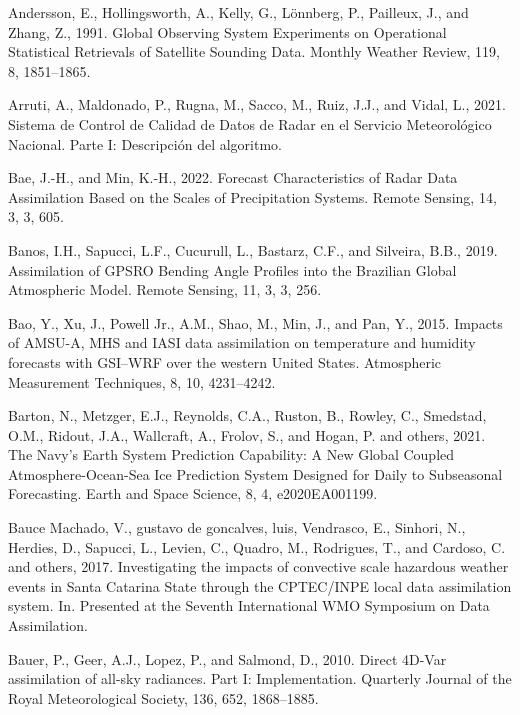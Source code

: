 \documentclass[12pt,oneside,a4paper]{reedthesis}
\begin{document}
\leavevmode\hypertarget{ref-andersson1991}{}%
Andersson, E., Hollingsworth, A., Kelly, G., Lönnberg, P., Pailleux, J., and Zhang, Z., 1991. Global Observing System Experiments on Operational Statistical Retrievals of Satellite Sounding Data. Monthly Weather Review, 119, 8, 1851--1865.

\leavevmode\hypertarget{ref-arruti2021}{}%
Arruti, A., Maldonado, P., Rugna, M., Sacco, M., Ruiz, J.J., and Vidal, L., 2021. Sistema de Control de Calidad de Datos de Radar en el Servicio Meteorológico Nacional. Parte I: Descripción del algoritmo.

\leavevmode\hypertarget{ref-bae2022}{}%
Bae, J.-H., and Min, K.-H., 2022. Forecast Characteristics of Radar Data Assimilation Based on the Scales of Precipitation Systems. Remote Sensing, 14, 3, 3, 605.

\leavevmode\hypertarget{ref-banos2019}{}%
Banos, I.H., Sapucci, L.F., Cucurull, L., Bastarz, C.F., and Silveira, B.B., 2019. Assimilation of GPSRO Bending Angle Profiles into the Brazilian Global Atmospheric Model. Remote Sensing, 11, 3, 3, 256.

\leavevmode\hypertarget{ref-bao2015}{}%
Bao, Y., Xu, J., Powell Jr., A.M., Shao, M., Min, J., and Pan, Y., 2015. Impacts of AMSU-A, MHS and IASI data assimilation on temperature and humidity forecasts with GSI--WRF over the western United States. Atmospheric Measurement Techniques, 8, 10, 4231--4242.

\leavevmode\hypertarget{ref-barton2021}{}%
Barton, N., Metzger, E.J., Reynolds, C.A., Ruston, B., Rowley, C., Smedstad, O.M., Ridout, J.A., Wallcraft, A., Frolov, S., and Hogan, P. and others, 2021. The Navy's Earth System Prediction Capability: A New Global Coupled Atmosphere-Ocean-Sea Ice Prediction System Designed for Daily to Subseasonal Forecasting. Earth and Space Science, 8, 4, e2020EA001199.

\leavevmode\hypertarget{ref-baucemachado2017}{}%
Bauce Machado, V., gustavo de goncalves, luis, Vendrasco, E., Sinhori, N., Herdies, D., Sapucci, L., Levien, C., Quadro, M., Rodrigues, T., and Cardoso, C. and others, 2017. Investigating the impacts of convective scale hazardous weather events in Santa Catarina State through the CPTEC/INPE local data assimilation system. In. Presented at the Seventh International WMO Symposium on Data Assimilation.

\leavevmode\hypertarget{ref-bauer2010}{}%
Bauer, P., Geer, A.J., Lopez, P., and Salmond, D., 2010. Direct 4D-Var assimilation of all-sky radiances. Part I: Implementation. Quarterly Journal of the Royal Meteorological Society, 136, 652, 1868--1885.
\end{document}
